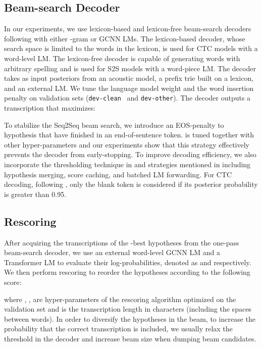 \documentclass{article}
\def\devclean{\texttt{dev-clean}}
\def\devother{\texttt{dev-other}}
\begin{document}
\subsection{Beam-search Decoder}
In our experiments, we use lexicon-based and lexicon-free beam-search decoders following \cite{collobert2016wav2letter,likhomanenko2019needs} with either -gram or GCNN LMs. The lexicon-based decoder, whose search space is limited to the words in the lexicon, is used for CTC models with a word-level LM. The lexicon-free decoder is capable of generating words with arbitrary spelling and is used for S2S models with a word-piece LM. The decoder takes as input posteriors from an acoustic model, a prefix trie built on a lexicon, and an external LM. We tune the language model weight  and the word insertion penalty  on validation sets (\devclean~ and \devother). The decoder outputs a transcription  that maximizes: 

To stabilize the Seq2Seq beam search, we introduce an EOS-penalty  to hypothesis that have finished in an end-of-sentence token.  is tuned together with other hyper-parameters and our experiments show that this strategy effectively prevents the decoder from early-stopping. To improve decoding efficiency, we also incorporate the thresholding technique in \cite{hannun2019TDS} and strategies mentioned in \cite{zeghidour2018fullyconv} including hypothesis merging, score caching, and batched LM forwarding. For CTC decoding, following \cite{park2018fully}, only the blank token is considered if its posterior probability is greater than 0.95.

\subsection{Rescoring}\label{sec:rescoring}
After acquiring the transcriptions of the -best hypotheses from the one-pass beam-search decoder, we use an external word-level GCNN LM and a Transformer LM to evaluate their log-probabilities, denoted as  and  respectively.
We then perform rescoring to reorder the hypotheses according to the following score:

where , ,  are hyper-parameters of the rescoring algorithm optimized on the validation set and  is the transcription length in characters (including the spaces between words). In order to diversify the hypotheses in the beam, to increase the probability that the correct transcription is included, we usually relax the threshold in the decoder and increase beam size when dumping beam candidates. 
\end{document}
